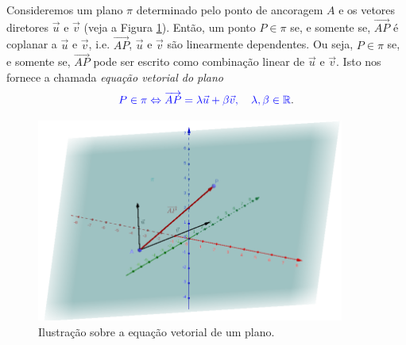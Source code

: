 Consideremos um plano $\pi$ determinado pelo ponto de ancoragem $A$ e os vetores diretores $\vec{u}$ e $\vec{v}$ (veja a Figura \ref{fig:ep_evp}). Então, um ponto $P\in \pi$ se, e somente se, $\overrightarrow{AP}$ é coplanar a $\vec{u}$ e $\vec{v}$, i.e. $\overrightarrow{AP}$, $\vec{u}$ e $\vec{v}$ são linearmente dependentes. Ou seja, $P\in\pi$ se, e somente se, $\overrightarrow{AP}$ pode ser escrito como combinação linear de $\vec{u}$ e $\vec{v}$. Isto nos fornece a chamada \emph{equação vetorial do plano}
\begin{equation}
  {\color{blue}P\in\pi \Leftrightarrow \overrightarrow{AP} = \lambda\vec{u}+\beta\vec{v},\quad\lambda,\beta\in\mathbb{R}}.
\end{equation}

\begin{figure}[H]
  \centering
  \includegraphics[width=0.9\textwidth]{cap_ep/dados/fig_ep_evp/fig}
  \caption{Ilustração sobre a equação vetorial de um plano.}
  \label{fig:ep_evp}
\end{figure}


